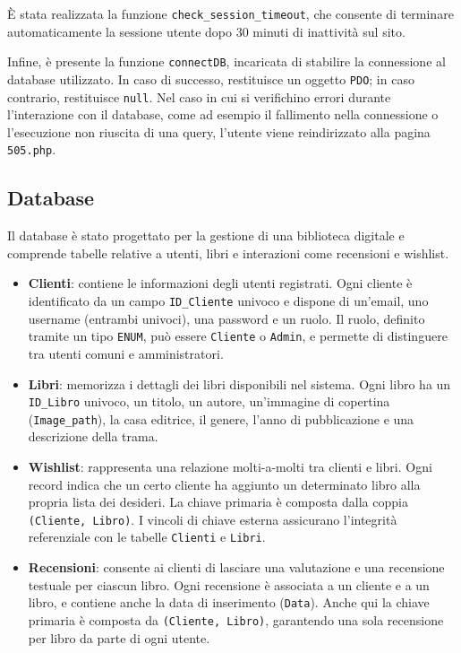 \documentclass{article}
\begin{document}
È stata realizzata la funzione \texttt{check\_session\_timeout}, che consente di terminare automaticamente la sessione utente dopo 30 minuti di inattività sul sito.

Infine, è presente la funzione \texttt{connectDB}, incaricata di stabilire la connessione al database utilizzato. In caso di successo, restituisce un oggetto \texttt{PDO}; in caso contrario, restituisce \texttt{null}.
Nel caso in cui si verifichino errori durante l'interazione con il database, come ad esempio il fallimento nella connessione o l'esecuzione non riuscita di una query, l'utente viene reindirizzato alla pagina \texttt{505.php}.
\subsection{Database}
Il database è stato progettato per la gestione di una biblioteca digitale e comprende tabelle relative a utenti, libri e interazioni come recensioni e wishlist.

\begin{itemize}
    \item \textbf{Clienti}: contiene le informazioni degli utenti registrati. Ogni cliente è identificato da un campo \texttt{ID\_Cliente} univoco e dispone di un'email, uno username (entrambi univoci), una password e un ruolo. Il ruolo, definito tramite un tipo \texttt{ENUM}, può essere \texttt{Cliente} o \texttt{Admin}, e permette di distinguere tra utenti comuni e amministratori.
    
    \item \textbf{Libri}: memorizza i dettagli dei libri disponibili nel sistema. Ogni libro ha un \texttt{ID\_Libro} univoco, un titolo, un autore, un'immagine di copertina (\texttt{Image\_path}), la casa editrice, il genere, l'anno di pubblicazione e una descrizione della trama.
    
    \item \textbf{Wishlist}: rappresenta una relazione molti-a-molti tra clienti e libri. Ogni record indica che un certo cliente ha aggiunto un determinato libro alla propria lista dei desideri. La chiave primaria è composta dalla coppia \texttt{(Cliente, Libro)}. I vincoli di chiave esterna assicurano l'integrità referenziale con le tabelle \texttt{Clienti} e \texttt{Libri}.
    
    \item \textbf{Recensioni}: consente ai clienti di lasciare una valutazione e una recensione testuale per ciascun libro. Ogni recensione è associata a un cliente e a un libro, e contiene anche la data di inserimento (\texttt{Data}). Anche qui la chiave primaria è composta da \texttt{(Cliente, Libro)}, garantendo una sola recensione per libro da parte di ogni utente.
\end{itemize}
\end{document}
